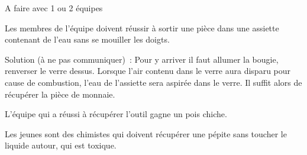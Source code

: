 \documentclass{grand-jeu}
\begin{document}
\begin{liste-materiel}
\end{liste-materiel}

\begin{regles}
A faire avec 1 ou 2 équipes

Les membres de l’équipe doivent réussir à sortir une pièce dans une assiette contenant de l’eau sans se mouiller les doigts.

Solution (à ne pas communiquer) : Pour y arriver il faut allumer la bougie, renverser le verre dessus. Lorsque l’air contenu dans le verre aura disparu pour cause de combustion, l’eau de l’assiette sera aspirée dans le verre. Il suffit alors de récupérer la pièce de monnaie.

L’équipe qui a réussi à récupérer l’outil gagne un pois chiche.
\end{regles}

\begin{imaginaire}
Les jeunes sont des chimistes qui doivent récupérer une pépite sans toucher le liquide autour, qui est toxique.
\end{imaginaire}

\begin{moments-stop}
\end{moments-stop}
\end{document}
